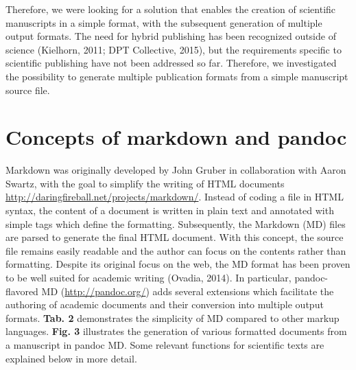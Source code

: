 \documentclass[10pt,fleqn]{wlpeerj}
\begin{document}
Therefore, we were looking for a solution that enables the creation of
scientific manuscripts in a simple format, with the subsequent
generation of multiple output formats. The need for hybrid publishing
has been recognized outside of science (Kielhorn, 2011; DPT Collective,
2015), but the requirements specific to scientific publishing have not
been addressed so far. Therefore, we investigated the possibility to
generate multiple publication formats from a simple manuscript source
file.

\section{Concepts of markdown and
pandoc}\label{concepts-of-markdown-and-pandoc}

Markdown was originally developed by John Gruber in collaboration with
Aaron Swartz, with the goal to simplify the writing of HTML documents
\url{http://daringfireball.net/projects/markdown/}. Instead of coding a
file in HTML syntax, the content of a document is written in plain text
and annotated with simple tags which define the formatting.
Subsequently, the Markdown (MD) files are parsed to generate the final
HTML document. With this concept, the source file remains easily
readable and the author can focus on the contents rather than
formatting. Despite its original focus on the web, the MD format has
been proven to be well suited for academic writing (Ovadia, 2014). In
particular, pandoc-flavored MD (\url{http://pandoc.org/}) adds several
extensions which facilitate the authoring of academic documents and
their conversion into multiple output formats. \textbf{Tab. 2}
demonstrates the simplicity of MD compared to other markup languages.
\textbf{Fig. 3} illustrates the generation of various formatted
documents from a manuscript in pandoc MD. Some relevant functions for
scientific texts are explained below in more detail.
\end{document}
